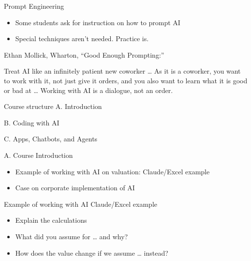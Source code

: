\documentclass[
  ignorenonframetext,
]{beamer}
\providecommand{\tightlist}{%
  \setlength{\itemsep}{0pt}\setlength{\parskip}{0pt}}\usepackage{longtable,booktabs,array}
\begin{document}
\begin{frame}{Prompt Engineering}
\label{prompt-engineering}
\begin{itemize}
\tightlist
\item
  Some students ask for instruction on how to prompt AI
\item
  Special techniques aren't needed. Practice is.
\end{itemize}

Ethan Mollick, Wharton, ``Good Enough Prompting:''

Treat AI like an infinitely patient new coworker \ldots{} As it is a
coworker, you want to work with it, not just give it orders, and you
also want to learn what it is good or bad at \ldots{} Working with AI is
a dialogue, not an order.
\end{frame}

\begin{frame}{Course structure}
\label{course-structure}
A. Introduction

B. Coding with AI

C. Apps, Chatbots, and Agents
\end{frame}

\begin{frame}{A. Course Introduction}
\label{a.-course-introduction}
\begin{itemize}
\tightlist
\item
  Example of working with AI on valuation: Claude/Excel example
\item
  Case on corporate implementation of AI
\end{itemize}
\end{frame}

\begin{frame}{Example of working with AI}
\label{example-of-working-with-ai}
Claude/Excel example

\begin{itemize}
\tightlist
\item
  Explain the calculations
\item
  What did you assume for \ldots{} and why?
\item
  How does the value change if we assume \ldots{} instead?
\end{itemize}
\end{frame}
\end{document}
